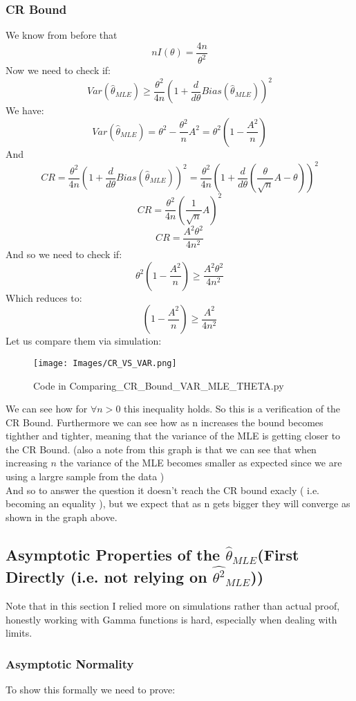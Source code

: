 \documentclass[12pt]{article}
\begin{document}
\subsubsection*{CR Bound}
We know from before that
\[
  nI(\theta) = \frac{4n}{\theta^2}
\]
Now we need to check if:
\[
  Var(\hat{\theta}_{MLE}) \geq \frac{\theta^2}{4n} (1+\frac{d}{d\theta}Bias(\hat{\theta}_{MLE}))^2
\]
We have:
\[
  Var(\hat{\theta}_{MLE}) = \theta^2 - \frac{\theta^2}{n}A^2 = \theta^2(1-\frac{A^2}{n})
\]
And
\[
  CR = \frac{\theta^2}{4n} (1+\frac{d}{d\theta}Bias(\hat{\theta}_{MLE}))^2 = \frac{\theta^2}{4n} (1+\frac{d}{d\theta}(\frac{\theta}{\sqrt{n}} A - \theta))^2
\]
\[
  CR = \frac{\theta^2}{4n} (\frac{1}{\sqrt{n}}A)^2
\]
\[
  CR = \frac{A^2\theta^2}{4n^2}
\]
And so we need to check if:
\[
  \theta^2(1-\frac{A^2}{n}) \geq \frac{A^2\theta^2}{4n^2}
\]
Which reduces to:
\[
  (1-\frac{A^2}{n}) \geq \frac{A^2}{4n^2}
\]
Let us compare them via simulation:
\begin{figure}[H]
  \centering
  \texttt{[image: Images/CR\_VS\_VAR.png]}
  \caption{Code in Comparing\_CR\_Bound\_VAR\_MLE\_THETA.py}
\end{figure}
We can see how for $\forall n>0$ this inequality holds. So this is a verification of the CR Bound.
Furthermore we can see how as n increases the bound becomes tighther and tighter, meaning that the variance of the MLE is getting closer to the CR Bound. (also a note from this graph is that we can see that when increasing $n$ the variance of the MLE becomes smaller as expected since we are using a largre sample from the data )\\
And so to answer the question it doesn't reach the CR bound exacly ( i.e. becoming an equality ), but we expect that as n gets bigger they will converge as shown in the graph above.\\
\subsection*{Asymptotic Properties of the $\hat{\theta}_{MLE}$(First Directly (i.e. not relying on $\hat{\theta^2}_{MLE}$))}
Note that in this section I relied more on simulations rather than actual proof, honestly working with Gamma functions is hard, especially when dealing with limits. 
\subsubsection*{Asymptotic Normality}
To show this formally we need to prove: 
\end{document}
